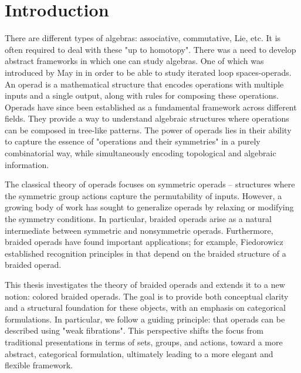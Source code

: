 
\section{Introduction}



There are different types of algebras: associative, commutative, Lie, etc.
It is often
required to deal with these "up to homotopy". There was a need to develop
abstract frameworks in which one can study algebras. One of which was introduced
by May in \cite{may} in order to be able to study iterated loop
spaces-operads. An operad is a mathematical structure that encodes operations
with multiple inputs and a single output, along with rules for composing these
operations. Operads have since been established as a fundamental framework
across different fields. They provide a way to understand algebraic structures
where operations can be composed in tree-like patterns. The power of operads
lies in their ability to capture the essence of "operations and their
symmetries" in a purely combinatorial way, while simultaneously encoding
topological and algebraic information.

The classical theory of operads focuses on symmetric operads -- structures where
the symmetric group actions capture the permutability of inputs. However, a
growing body of work has sought to generalize operads by relaxing or modifying
the symmetry conditions. In particular, braided operads arise as a natural
intermediate between symmetric and nonsymmetric operads. Furthermore, braided
operads have found important applications; for example, Fiedorowicz established
recognition principles in \cite{EO} that depend on the braided structure of a
braided operad.

\medskip

This thesis investigates the theory of braided operads and extends it to a new
notion: colored braided operads. The goal is to provide both conceptual clarity
and a structural foundation for these objects, with an emphasis on categorical
formulations. In particular, we follow a guiding principle: that operads can be
described using "weak fibrations". This perspective shifts the focus from
traditional presentations in terms of sets, groups, and actions, toward a more
abstract, categorical formulation, ultimately leading to a more elegant and
flexible framework.

\medskip

